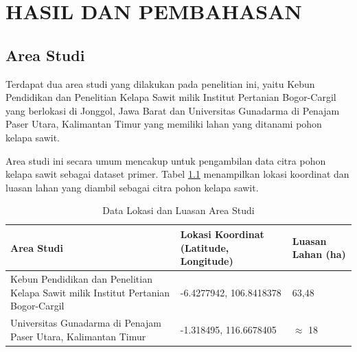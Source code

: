 \chapter{HASIL DAN PEMBAHASAN}

\vspace{1cm}
\section{Area Studi}
\hspace{1,2cm}
Terdapat dua area studi yang dilakukan pada penelitian ini, yaitu Kebun Pendidikan dan Penelitian Kelapa Sawit milik Institut Pertanian Bogor-Cargil yang berlokasi di Jonggol, Jawa Barat dan Universitas Gunadarma di Penajam Paser Utara, Kalimantan Timur yang memiliki lahan yang ditanami pohon kelapa sawit.

Area studi ini secara umum mencakup untuk pengambilan data citra pohon kelapa sawit sebagai dataset primer. Tabel \ref{tbl:Data-Lokasi-dan-Luasan-Area-Studi} menampilkan lokasi koordinat dan luasan lahan yang diambil sebagai citra pohon kelapa sawit.

\begin{singlespace}
	\begin{table}[H]
		\centering
		\caption{Data Lokasi dan Luasan Area Studi}
		\label{tbl:Data-Lokasi-dan-Luasan-Area-Studi}
		\begin{tabular}{|p{4cm}|p{4cm}|p{4cm}|}
			\hline
			\rowcolor[HTML]{D9D9D9}
			Area Studi                                                                         & Lokasi Koordinat (Latitude, Longitude) & Luasan Lahan (ha) \\ \hline

			Kebun Pendidikan dan Penelitian Kelapa Sawit milik Institut Pertanian Bogor-Cargil & -6.4277942, 106.8418378                                                          & 63,48                                                          \\ \hline
			
			Universitas Gunadarma di Penajam Paser Utara, Kalimantan Timur                     & -1.318495, 116.6678405                                                           & $\approx$ 18                                                           \\ \hline
			\end{tabular}
	\end{table}
\end{singlespace}

